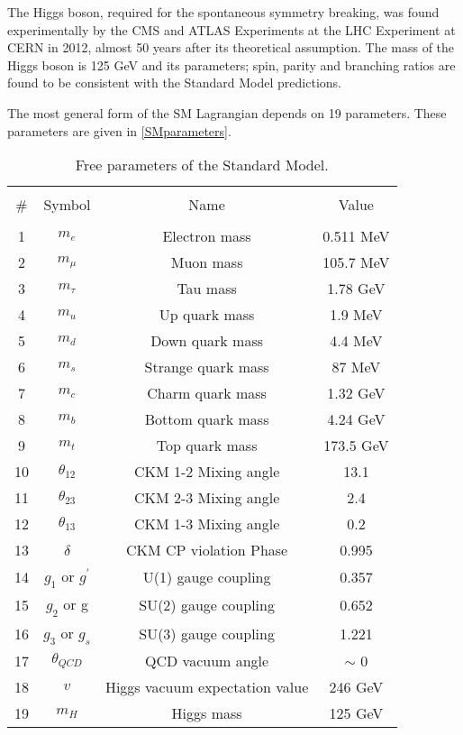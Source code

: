 The Higgs boson, required for the spontaneous symmetry breaking, was found experimentally by the CMS and ATLAS Experiments at the LHC Experiment at CERN\cite{HiggsCMS,HiggsATLAS} in 2012, almost 50 years after its theoretical assumption. The mass of the Higgs boson is 125 GeV and its parameters; spin, parity and branching ratios are found to be consistent with the Standard Model predictions\cite{Higgsprecision1, Higgsprecision2}.

The most general form of the SM Lagrangian depends on 19 parameters. These parameters are given in \autoref{SMparameters}.
\begin{table*}[ht]
	{\setlength{\tabcolsep}{14pt}
		\caption{Free parameters of the Standard Model.}
		\begin{center}
			\vspace{-6mm}
			\begin{tabular}{cccc}
				\hline \\[-2.45ex] \hline \\[-2.1ex]
				\# & Symbol & Name & Value \\
				\hline \\[-1.8ex]
				1 & $m_e$ & Electron mass & 0.511 MeV \\
				2 & $m_\mu$ & Muon mass & 105.7 MeV \\
				3 & $m_\tau$ & Tau mass & 1.78 GeV \\
				4 & $m_u$ & Up quark mass & 1.9 MeV \\
				5 & $m_d$ & Down quark mass & 4.4 MeV \\
				6 & $m_s$ & Strange quark mass & 87 MeV \\
				7 & $m_c$ & Charm quark mass & 1.32 GeV \\
				8 & $m_b$ & Bottom quark mass & 4.24 GeV \\
				9 & $m_t$ & Top quark mass & 173.5 GeV \\
				10 & $\theta_{12}$ & CKM 1-2 Mixing angle & 13.1\textdegree \\
				11 & $\theta_{23}$ & CKM 2-3 Mixing angle & 2.4\textdegree \\
				12 & $\theta_{13}$ & CKM 1-3 Mixing angle & 0.2\textdegree \\
				13 & $\delta$ & CKM CP violation Phase & 0.995 \\
				14 & $g_1$ or $g^\prime$ & U(1) gauge coupling & 0.357 \\
				15 & $g_2$ or g & SU(2) gauge coupling & 0.652 \\
				16 & $g_3$ or $g_s$ & SU(3) gauge coupling & 1.221 \\
				17 & $\theta_{QCD}$ & QCD vacuum angle & $\sim $ 0 \\
				18 & $v$ & Higgs vacuum expectation value & 246 GeV \\
				19 & $m_H$ & Higgs mass & 125 GeV \\
				\hline
			\end{tabular}
			\vspace{-6mm}
		\end{center}
		\label{SMparameters}}
\end{table*}

